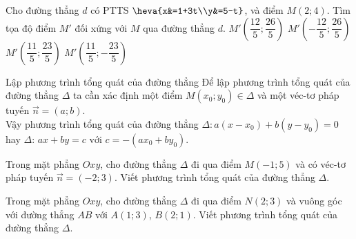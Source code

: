 \begin{ex}%
	Cho đường thẳng $d$ có PTTS $\heva{x&=1+3t\\y&=5-t}$, và điểm $M(2;4)$. Tìm tọa độ điểm $M'$ đối xứng với $M$ qua đường thẳng $d$.
	\choice
	{\True $M'\left(\dfrac{12}{5};\dfrac{26}{5}\right)$}
	{$M'\left(-\dfrac{12}{5};\dfrac{26}{5}\right)$}
	{$M'\left(\dfrac{11}{5};\dfrac{23}{5}\right)$}
	{$M'\left(\dfrac{11}{5};-\dfrac{23}{5}\right)$}
\end{ex}
\begin{dang}{Lập phương trình tổng quát của đường thẳng}
	Để lập phương trình tổng quát của đường thẳng $\Delta$ ta cần xác định một điểm $M \left(x_0; y_0 \right) \in \Delta$ và một véc-tơ pháp tuyến $ \overrightarrow{n} = \left(a; b \right)$.\\
	Vậy phương trình tổng quát của đường thẳng $\Delta \colon a \left(x - x_0 \right) + b \left(y - y_0 \right) = 0$ hay $\Delta$: $ ax + by = c \text{ với } c = - \left(ax_0 + by_0 \right)$.
\end{dang}
\begin{vd}%
	Trong mặt phẳng $Oxy$, cho đường thẳng $\Delta$ đi qua điểm $M(-1;5)$ và có véc-tơ pháp tuyến $ \overrightarrow{n} = \left(-2;3 \right)$. Viết phương trình tổng quát của đường thẳng $\Delta$.
\end{vd}
\begin{vd}%
	Trong mặt phẳng $Oxy$, cho đường thẳng $\Delta$ đi qua điểm $N(2;3)$ và vuông góc với đường thẳng $AB$ với $A(1;3)$, $B(2;1)$. Viết phương trình tổng quát của đường thẳng $\Delta$.
\end{vd}
